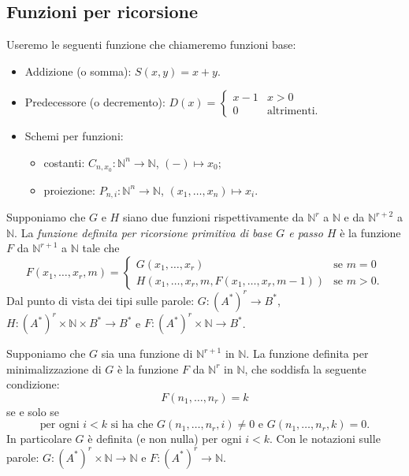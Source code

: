 \subsection{Funzioni per ricorsione}

Useremo le seguenti  funzione che chiameremo
funzioni base:
\begin{itemize}
    \item Addizione (o somma): $S(x,y)=x+y$.
    \item Predecessore (o decremento): $D(x)=\begin{cases}x-1 & x>0\\ 0 & \text{altrimenti.}\end{cases}$
    \item Schemi per funzioni:
    \begin{itemize}
        \item costanti: $C_{n,x_0}\colon\mathbb N^n\to\mathbb N$, $(-)\mapsto x_0$;
        \item proiezione: $P_{n,i}\colon\mathbb N^n\to\mathbb N$, $(x_1,\dots,x_n)\mapsto x_i$.
    \end{itemize}
\end{itemize}

\begin{defi}
Supponiamo che $G$ e $H$ siano due funzioni rispettivamente da $\mathbb N^{r}$ a $\mathbb N$ e da $\mathbb N^{r+2}$ a $\mathbb N$. 
La \textit{funzione definita per ricorsione primitiva di base $G$ e passo $H$} è la funzione $F$ da $\mathbb N^{r+1}$ a $\mathbb N$ tale che
\[
F(x_1,\dots,x_r,m)=
\begin{cases}
G(x_1,\dots,x_r) & \text{se } m=0\\
H(x_1,\dots,x_r,m,F(x_1,\dots,x_r,m-1)) & \text{se } m>0.
\end{cases}
\]
Dal punto di vista dei tipi sulle parole: $G\colon (A^*)^r\to B^*$, $H\colon (A^*)^r\times\mathbb N\times B^*\to B^*$ e $F\colon (A^*)^r\times\mathbb N\to B^*$.
\end{defi}

\begin{defi}
Supponiamo che $G$ sia una funzione di $\mathbb N^{r+1}$ in $\mathbb N$. La funzione definita per minimalizzazione di $G$ è la funzione $F$ da $\mathbb N^r$ in $\mathbb N$, che soddisfa la seguente condizione:
\[
F(n_1,\dots,n_r)=k
\]
se e solo se
\[
\text{per ogni } i<k \text{ si ha che } G(n_1,\dots,n_r,i)\neq 0 \text{ e } G(n_1,\dots,n_r,k)=0.
\]
In particolare $G$ è definita (e non nulla) per ogni $i<k$. Con le notazioni sulle parole: $G\colon (A^*)^r\times\mathbb N\to\mathbb N$ e $F\colon (A^*)^r\to\mathbb N$.
\end{defi}



